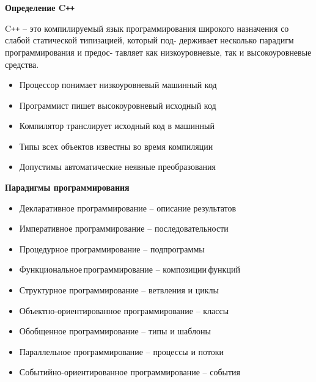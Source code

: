 \documentclass{beamer} %
\begin{document}
\begin{frame}{\bf Определение C\texttt{++}}

    \begin{block}
    \justifying C\texttt{++} -- это компилируемый язык программирования широкого назначения со слабой статической типизацией, который под- держивает несколько парадигм программирования и предос- тавляет как низкоуровневые, так и высокоуровневые средства.
    \end{block}

    \begin{itemize}

        \item Процессор понимает низкоуровневый машинный код

        \item Программист пишет высокоуровневый исходный код

        \item Компилятор транслирует исходный код в машинный

        \item Типы всех объектов известны во время компиляции

        \item Допустимы автоматические неявные преобразования
        
    \end{itemize}
    
\end{frame}

\begin{frame}{\bf Парадигмы программирования}
    
    \begin{itemize}

        \item Декларативное программирование -- описание результатов

        \item Императивное программирование -- последовательности

        \item Процедурное программирование -- подпрограммы

        \item Функциональное\,программирование -- композиции\,функций
        
        \item Структурное программирование -- ветвления и циклы
        
        \item Объектно-ориентированное программирование -- классы
        
        \item Обобщенное программирование -- типы и шаблоны
        
        \item Параллельное программирование -- процессы и потоки
        
        \item Событийно-ориентированное программирование -- события
        
    \end{itemize}
    
\end{frame}
\end{document}
